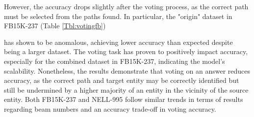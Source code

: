 However, the accuracy drops slightly after the voting process, as the correct path must be selected from the paths found. In particular, the "origin" dataset in FB15K-237 (Table \ref{Tbl:votingfb})

 has shown to be anomalous, achieving lower accuracy than expected despite being a larger dataset. The voting task has proven to positively impact accuracy, especially for the combined dataset in FB15K-237, indicating the model's scalability. Nonetheless, the results demonstrate that voting on an answer reduces accuracy, as the correct path and target entity may be correctly identified but still be undermined by a higher majority of an entity in the vicinity of the source entity. Both FB15K-237 and NELL-995 follow similar trends in terms of results regarding beam numbers and an accuracy trade-off in voting accuracy.
\textc

